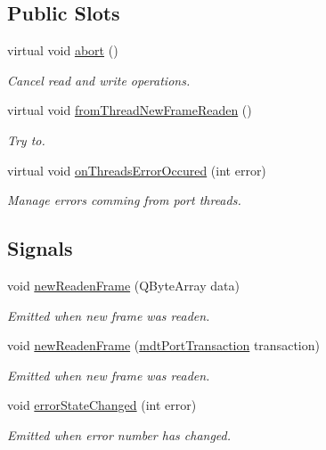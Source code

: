 \subsection*{Public Slots}
\begin{DoxyCompactItemize}
\item 
virtual void \hyperlink{classmdt_port_manager_a1d185e9bb610aee16ccd9499ae7bff0d}{abort} ()
\begin{DoxyCompactList}\small\item\em Cancel read and write operations. \end{DoxyCompactList}\item 
virtual void \hyperlink{classmdt_port_manager_a4fcc8f0699b655156e661bb3de6056cc}{fromThreadNewFrameReaden} ()
\begin{DoxyCompactList}\small\item\em Try to. \end{DoxyCompactList}\item 
virtual void \hyperlink{classmdt_port_manager_a7e45b8e3475e5182ed12218616664d07}{onThreadsErrorOccured} (int error)
\begin{DoxyCompactList}\small\item\em Manage errors comming from port threads. \end{DoxyCompactList}\end{DoxyCompactItemize}
\subsection*{Signals}
\begin{DoxyCompactItemize}
\item 
void \hyperlink{classmdt_port_manager_a77ef4a432306638f5b0f91df7863ac62}{newReadenFrame} (QByteArray data)
\begin{DoxyCompactList}\small\item\em Emitted when new frame was readen. \end{DoxyCompactList}\item 
void \hyperlink{classmdt_port_manager_a915ff3372cccd5f412b828cc81a3381f}{newReadenFrame} (\hyperlink{classmdt_port_transaction}{mdtPortTransaction} transaction)
\begin{DoxyCompactList}\small\item\em Emitted when new frame was readen. \end{DoxyCompactList}\item 
void \hyperlink{classmdt_port_manager_a053ba62f090eced0cf635c9be5c6b052}{errorStateChanged} (int error)
\begin{DoxyCompactList}\small\item\em Emitted when error number has changed. \end{DoxyCompactList}\end{DoxyCompactItemize}
